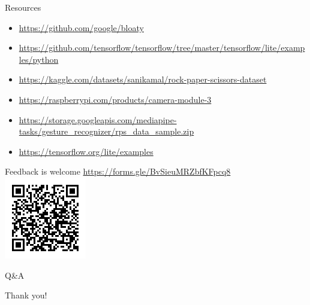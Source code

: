 \documentclass{beamer}
\begin{document}
\begin{frame}{Resources}
  \begin{itemize}
	\item \url{https://github.com/google/bloaty}
	\item \url{https://github.com/tensorflow/tensorflow/tree/master/tensorflow/lite/examples/python}
	\item \url{https://kaggle.com/datasets/sanikamal/rock-paper-scissors-dataset}
	\item \url{https://raspberrypi.com/products/camera-module-3}
	\item \url{https://storage.googleapis.com/mediapipe-tasks/gesture_recognizer/rps_data_sample.zip}
	\item \url{https://tensorflow.org/lite/examples}
  \end{itemize}
\end{frame}

\begin{frame}{Feedback is welcome}
  \url{https://forms.gle/BvSieuMRZbfKFpcq8}
  \includegraphics[width=\linewidth,height=0.75\textheight,keepaspectratio]{images/feedback.png}
\end{frame}

\begin{frame}{Q\&A}
  \begin{center}
Thank you!
  \end{center}
\end{frame}
\end{document}
